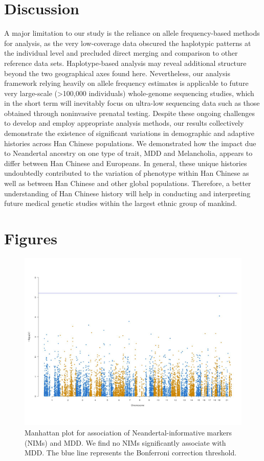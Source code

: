 \section{Discussion}
A major limitation to our study is the reliance on allele frequency-based methods for analysis, as the very low-coverage data obscured the haplotypic patterns at the individual level and precluded direct merging and comparison to other reference data sets. Haplotype-based analysis may reveal additional structure beyond the two geographical axes found here. Nevertheless, our analysis framework relying heavily on allele frequency estimates is applicable to future very large-scale (>100,000 individuals) whole-genome sequencing studies, which in the short term will inevitably focus on ultra-low sequencing data such as those obtained through noninvasive prenatal testing. Despite these ongoing challenges to develop and employ appropriate analysis methods, our results collectively demonstrate the existence of significant variations in demographic and adaptive histories across Han Chinese populations. We demonstrated how the impact due to Neandertal ancestry on one type of trait, MDD and Melancholia, appears to differ between Han Chinese and Europeans. In general, these unique histories undoubtedly contributed to the variation of phenotype within Han Chinese as well as between Han Chinese and other global populations. Therefore, a better understanding of Han Chinese history will help in conducting and interpreting future medical genetic studies within the largest ethnic group of mankind.
\newpage
\section{Figures}
\begin{figure}[!htb]
    \centering
    \includegraphics[width=\textwidth]{chapter2/figures/fig2.1.pdf}
    \caption{Manhattan plot for association of Neandertal-informative markers (NIMs) and MDD. We find no NIMs significantly associate with MDD. The blue line represents the Bonferroni correction threshold.}
    \label{fig:2.1}
\end{figure}
\clearpage


